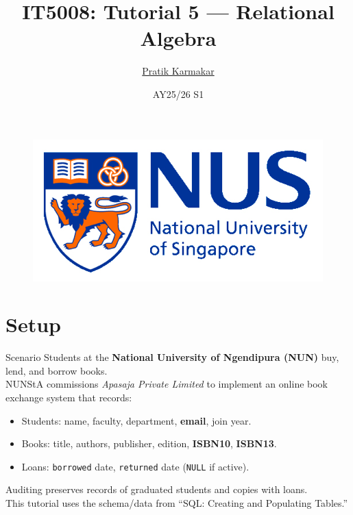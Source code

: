 \documentclass{beamer}
\author{\href{https://pratik2358.github.io/}{Pratik Karmakar}}
\title{IT5008: Tutorial 5 — Relational Algebra}
\institute{
  School of Computing,\\
  National University of Singapore
}
\date{AY25/26 S1}
\begin{document}
\begin{frame}
  \titlepage
  \begin{figure}[htpb]
    \begin{center}
      \includegraphics[keepaspectratio, scale=0.18]{nus-logo.png}
    \end{center}
  \end{figure}
\end{frame}

\section{Setup}
\begin{frame}{Scenario}
\small
Students at the \textbf{National University of Ngendipura (NUN)} buy, lend, and borrow books.\\
NUNStA commissions \emph{Apasaja Private Limited} to implement an online book exchange system that records:
\begin{itemize}\itemsep3pt
  \item Students: name, faculty, department, \textbf{email}, join year.
  \item Books: title, authors, publisher, edition, \textbf{ISBN10}, \textbf{ISBN13}.
  \item Loans: \texttt{borrowed} date, \texttt{returned} date (\texttt{NULL} if active).
\end{itemize}
Auditing preserves records of graduated students and copies with loans.\\
This tutorial uses the schema/data from “SQL: Creating and Populating Tables.”
\end{frame}

\end{document}
